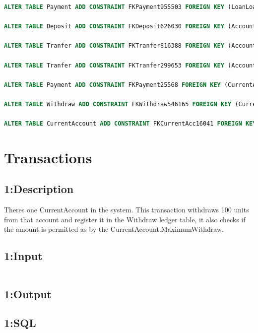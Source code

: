\documentclass[a4paper, 10pt]{article}
\begin{document}
\begin{lstlisting}[language=SQL]
ALTER TABLE Payment ADD CONSTRAINT FKPayment955503 FOREIGN KEY (LoanLoanID) REFERENCES Loan (LoanID);

ALTER TABLE Deposit ADD CONSTRAINT FKDeposit626030 FOREIGN KEY (AccountAccountID) REFERENCES Account (AccountID);

ALTER TABLE Tranfer ADD CONSTRAINT FKTranfer816388 FOREIGN KEY (AccountAccountID) REFERENCES Account (AccountID);

ALTER TABLE Tranfer ADD CONSTRAINT FKTranfer299653 FOREIGN KEY (AccountAccountID2) REFERENCES Account (AccountID);

ALTER TABLE Payment ADD CONSTRAINT FKPayment25568 FOREIGN KEY (CurrentAccountAccountID) REFERENCES CurrentAccount (AccountAccountID);

ALTER TABLE Withdraw ADD CONSTRAINT FKWithdraw546165 FOREIGN KEY (CurrentAccountAccountID) REFERENCES CurrentAccount (AccountAccountID);

ALTER TABLE CurrentAccount ADD CONSTRAINT FKCurrentAcc16041 FOREIGN KEY (AccountAccountID) REFERENCES Account (AccountID);
\end{lstlisting}

\section{Transactions}
\subsection{1:Description}
Theres one CurrentAccount in the system. This transaction withdraws 100 units from that account and register it in the Withdraw ledger table, it also checks if the amount is permitted as by the CurrentAccount.MaximumWithdraw.

\subsection{1:Input}
\begin{lstlisting}[language=SQL]
\end{lstlisting}

\subsection{1:Output}

\subsection{1:SQL}
\begin{lstlisting}[language=SQL]
\end{lstlisting}
\end{document}

